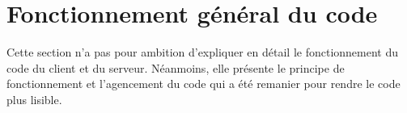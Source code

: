 \section{Fonctionnement général du code}

Cette section n'a pas pour ambition d'expliquer en détail le fonctionnement du
code du client et du serveur. Néanmoins, elle présente le principe de
fonctionnement et l'agencement du code qui a été remanier pour rendre le code
plus lisible.




